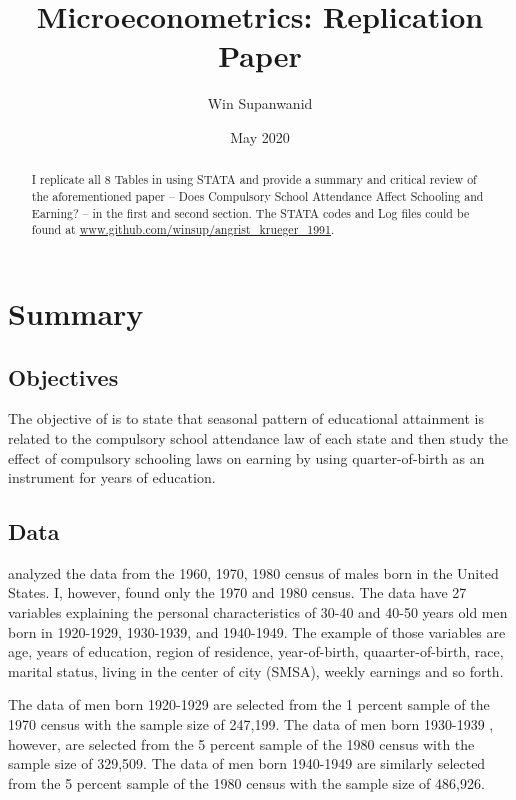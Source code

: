 \documentclass{article}
\title{Microeconometrics:  Replication Paper}
\author{Win Supanwanid}
\date{May 2020}
\begin{document}
\renewcommand{\abstractname}{\vspace{-\baselineskip}} %
\maketitle

\begin{abstract}

I replicate all 8 Tables in \cite{angrist1991} using STATA and provide a summary and critical review of the aforementioned paper -- Does Compulsory School Attendance Affect Schooling and Earning? --
in the first and second section. The STATA codes and Log files could be found at \url{www.github.com/winsup/angrist_krueger_1991}.

\end{abstract}


\section{Summary}

\subsection{Objectives}

The objective of \cite{angrist1991} is to state that seasonal pattern of educational attainment is related to the compulsory school attendance law of each state
and then study the effect of compulsory schooling laws on earning by using quarter-of-birth as an instrument for years of education.



\subsection{Data}

 \cite{angrist1991} analyzed the data from the 1960, 1970, 1980 census of males born in the United States. I, however, found only the 1970 and 1980 census. 
The data have 27 variables explaining the personal characteristics of 30-40 and 40-50 years old men born in 1920-1929, 1930-1939, and 1940-1949. The example of those variables are age, years of education, region of residence, year-of-birth, quaarter-of-birth, race, marital status, living in the center of city (SMSA), weekly earnings and so forth.

The data of men born 1920-1929 are selected from the 1 percent sample of the 1970 census with the sample size of 247,199. The data of men born 1930-1939 , however, are selected from the 5 percent sample of the 1980 census with the sample size of 329,509. The data of men born 1940-1949 are similarly selected from the 5 percent sample of the 1980 census with the sample size of 486,926.
\end{document}
